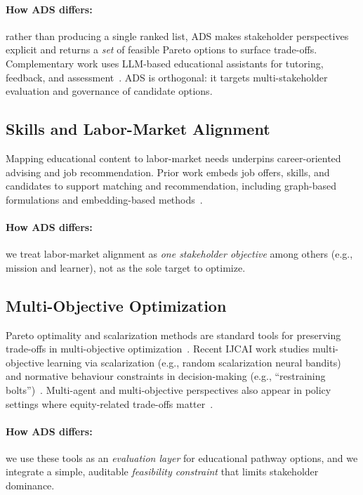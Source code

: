 \documentclass[sigconf,review]{acmart}
\newcommand{\ADS}{\textsc{ADS}\xspace}
\begin{document}
\paragraph{How ADS differs:} rather than producing a single ranked list, \ADS makes stakeholder perspectives explicit and returns a \emph{set} of feasible Pareto options to surface trade-offs.
Complementary work uses LLM-based educational assistants for tutoring, feedback, and assessment~\cite{coderagent2025,collabAgents2025,llmGrading2025,handByHand2025,livepoem2025}. \ADS is orthogonal: it targets multi-stakeholder evaluation and governance of candidate options.

\subsection{Skills and Labor-Market Alignment}
Mapping educational content to labor-market needs underpins career-oriented advising and job recommendation. Prior work embeds job offers, skills, and candidates to support matching and recommendation, including graph-based formulations and embedding-based methods~\cite{giabelli2021skills2job,kara2022skillEmbeddings,leon2024transversalSkills}.
\paragraph{How ADS differs:} we treat labor-market alignment as \emph{one stakeholder objective} among others (e.g., mission and learner), not as the sole target to optimize.

\subsection{Multi-Objective Optimization}
Pareto optimality and scalarization methods are standard tools for preserving trade-offs in multi-objective optimization~\cite{roijers2013survey_mosdm,deb2002nsga2}.
Recent IJCAI work studies multi-objective learning via scalarization (e.g., random scalarization neural bandits) and normative behaviour constraints in decision-making (e.g., ``restraining bolts'')~\cite{monb2025,restrainingBolts2025}.
Multi-agent and multi-objective perspectives also appear in policy settings where equity-related trade-offs matter~\cite{equityMAMORL2025}.
\paragraph{How ADS differs:} we use these tools as an \emph{evaluation layer} for educational pathway options, and we integrate a simple, auditable \emph{feasibility constraint} that limits stakeholder dominance.
\end{document}
